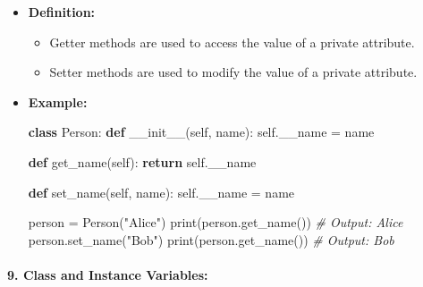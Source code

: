 \documentclass[11pt]{article}
\providecommand{\tightlist}{%
      \setlength{\itemsep}{0pt}\setlength{\parskip}{0pt}}
\newenvironment{Shaded}{}{}
\newcommand{\KeywordTok}[1]{\textcolor[rgb]{0.00,0.44,0.13}{\textbf{{#1}}}}
\newcommand{\StringTok}[1]{\textcolor[rgb]{0.25,0.44,0.63}{{#1}}}
\newcommand{\CommentTok}[1]{\textcolor[rgb]{0.38,0.63,0.69}{\textit{{#1}}}}
\newcommand{\FunctionTok}[1]{\textcolor[rgb]{0.02,0.16,0.49}{{#1}}}
\newcommand{\NormalTok}[1]{{#1}}
\newcommand{\VariableTok}[1]{\textcolor[rgb]{0.10,0.09,0.49}{{#1}}}
\newcommand{\ControlFlowTok}[1]{\textcolor[rgb]{0.00,0.44,0.13}{\textbf{{#1}}}}
\newcommand{\OperatorTok}[1]{\textcolor[rgb]{0.40,0.40,0.40}{{#1}}}
\newcommand{\BuiltInTok}[1]{{#1}}
\begin{document}
\begin{itemize}
\item
  \textbf{Definition:}

  \begin{itemize}
  \tightlist
  \item
    Getter methods are used to access the value of a private attribute.
  \item
    Setter methods are used to modify the value of a private attribute.
  \end{itemize}
\item
  \textbf{Example:}

\begin{Shaded}
\begin{Highlighting}[]
\KeywordTok{class}\NormalTok{ Person:}
    \KeywordTok{def} \FunctionTok{__init__}\NormalTok{(}\VariableTok{self}\NormalTok{, name):}
        \VariableTok{self}\NormalTok{.__name }\OperatorTok{=}\NormalTok{ name}

    \KeywordTok{def}\NormalTok{ get_name(}\VariableTok{self}\NormalTok{):}
        \ControlFlowTok{return} \VariableTok{self}\NormalTok{.__name}

    \KeywordTok{def}\NormalTok{ set_name(}\VariableTok{self}\NormalTok{, name):}
        \VariableTok{self}\NormalTok{.__name }\OperatorTok{=}\NormalTok{ name}

\NormalTok{person }\OperatorTok{=}\NormalTok{ Person(}\StringTok{"Alice"}\NormalTok{)}
\BuiltInTok{print}\NormalTok{(person.get_name())  }\CommentTok{# Output: Alice}
\NormalTok{person.set_name(}\StringTok{"Bob"}\NormalTok{)}
\BuiltInTok{print}\NormalTok{(person.get_name())  }\CommentTok{# Output: Bob}
\end{Highlighting}
\end{Shaded}
\end{itemize}

\paragraph{\texorpdfstring{9. \textbf{Class and Instance
Variables:}}{9. Class and Instance Variables:}}\label{class-and-instance-variables}
\end{document}
